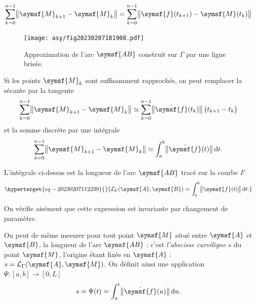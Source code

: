 \documentclass[
  a4paper,
  DIV=11,
  numbers=noendperiod]{scrreprt}
\newcommand{\D}{{\mathrm d}}
\newcommand{\point}[1]{\symsf{#1}}
\begin{document}
\[
\sum _ {k = 0} ^ {n - 1} \bigl \lVert \point{M} _ {k+1} - \point{M} _ k \bigr \rVert
= \sum _ {k = 0} ^ {n - 1} \bigl \lVert  \point{f}(t _ {k+1}) - \point{M}(t _ k) \bigr \rVert
\]

\begin{figure}

{\centering \texttt{[image: asy/fig20230207181908.pdf]}

}

\caption{\label{fig-20230207181908}Approximation de l'arc \(\point{AB}\)
construit sur \(\Gamma\) par une ligne brisée.}

\end{figure}

Si les points \(\point{M}_k\) sont suffisamment rapprochés, on peut
remplacer la sécante par la tangente \[
\sum _ {k = 0} ^ {n - 1} \bigl \lVert \point{M} _ {k+1} - \point{M} _ k \bigr \rVert
\simeq \sum _ {k = 0} ^ {n - 1} \bigl \lVert \dot{\point{f}}(t _ k) \bigr \rVert \, \bigl ( t _ {k+1} - t _ k \bigr)
\] et la somme discrète par une intégrale \[
\sum _ {k = 0} ^ {n - 1} \bigl \lVert \point{M} _ {k+1} - \point{M} _ k \bigr \rVert
\simeq \int _ {a} ^ {b} \bigl \lVert  \dot{\point{f}}(t) \bigr \rVert \, \D t.
\]

L'intégrale ci-dessus est la longueur de l'arc \(\point{AB}\) tracé sur
la courbe \(\Gamma\)
\begin{equation}\protect\hypertarget{eq-20230207112239}{}{
\mathcal{L} _ \Gamma(\point{A}, \point{B}) = \int _ {a} ^ {b} \bigl \lVert  \dot{\point{f}}(t) \bigr \rVert \, \D t.
}\label{eq-20230207112239}\end{equation}

\begin{tcolorbox}[enhanced jigsaw, toprule=.15mm, breakable, left=2mm, rightrule=.15mm, colbacktitle=quarto-callout-note-color!10!white, colframe=quarto-callout-note-color-frame, title=\textcolor{quarto-callout-note-color}{\faInfo}\hspace{0.5em}{Note}, bottomtitle=1mm, arc=.35mm, coltitle=black, opacityback=0, leftrule=.75mm, titlerule=0mm, toptitle=1mm, bottomrule=.15mm, opacitybacktitle=0.6, colback=white]

On vérifie aisément que cette expression est invariante par changement
de paramètre.

\end{tcolorbox}

On peut de même mesurer pour tout point \(\point{M}\) situé entre
\(\point{A}\) et \(\point{B}\), la longueur de l'arc \(\point{AB}\) :
c'est \emph{l'abscisse curviligne} \(s\) du point \(\point{M}\),
l'origine étant fixée en \(\point{A}\) :
\(s = \mathcal{L}_\Gamma(\point{A}, \point{M})\). On définit ainsi une
application \(\Psi \colon [a, b] \longrightarrow [0, L]\) \[
 s = \Psi(t) = \int_a^t \bigl \lVert  \dot{\point{f}}(u) \bigr \rVert \, \D u.
\]
\end{document}
